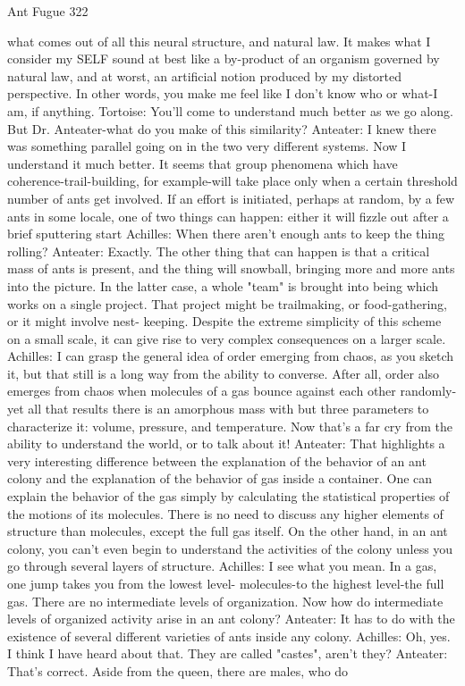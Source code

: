 Ant Fugue                                                                                 322

    what comes out of all this neural structure, and natural law. It makes what I consider
    my SELF sound at best like a by-product of an organism governed by natural law,
    and at worst, an artificial notion produced by my distorted perspective. In other
    words, you make me feel like I don't know who or what-I am, if anything.
Tortoise: You'll come to understand much better as we go along. But Dr.
Anteater-what do you make of this similarity?
Anteater: I knew there was something parallel going on in the two very different systems.
    Now I understand it much better. It seems that group phenomena which have
    coherence-trail-building, for example-will take place only when a certain threshold
    number of ants get involved. If an effort is initiated, perhaps at random, by a few ants
    in some locale, one of two things can happen: either it will fizzle out after a brief
    sputtering start
Achilles: When there aren't enough ants to keep the thing rolling?
Anteater: Exactly. The other thing that can happen is that a critical mass of ants is
    present, and the thing will snowball, bringing more and more ants into the picture. In
    the latter case, a whole "team" is brought into being which works on a single project.
    That project might be trailmaking, or food-gathering, or it might involve nest-
    keeping. Despite the extreme simplicity of this scheme on a small scale, it can give
    rise to very complex consequences on a larger scale.
Achilles: I can grasp the general idea of order emerging from chaos, as you sketch it, but
    that still is a long way from the ability to converse. After all, order also emerges from
    chaos when molecules of a gas bounce against each other randomly-yet all that
    results there is an amorphous mass with but three parameters to characterize it:
    volume, pressure, and temperature. Now that's a far cry from the ability to understand
    the world, or to talk about it!
Anteater: That highlights a very interesting difference between the explanation of the
    behavior of an ant colony and the explanation of the behavior of gas inside a
    container. One can explain the behavior of the gas simply by calculating the
    statistical properties of the motions of its molecules. There is no need to discuss any
    higher elements of structure than molecules, except the full gas itself. On the other
    hand, in an ant colony, you can't even begin to understand the activities of the colony
    unless you go through several layers of structure.
Achilles: I see what you mean. In a gas, one jump takes you from the lowest level-
    molecules-to the highest level-the full gas. There are no intermediate levels of
    organization. Now how do intermediate levels of organized activity arise in an ant
    colony?
Anteater: It has to do with the existence of several different varieties of ants inside any
    colony.
Achilles: Oh, yes. I think I have heard about that. They are called "castes", aren't they?
Anteater: That's correct. Aside from the queen, there are males, who do





